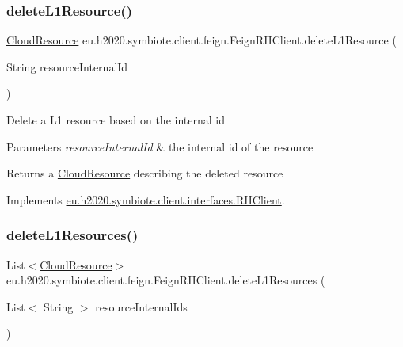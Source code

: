 \subsubsection{\texorpdfstring{delete\+L1\+Resource()}{deleteL1Resource()}}
{\footnotesize\ttfamily \hyperlink{classeu_1_1h2020_1_1symbiote_1_1cloud_1_1model_1_1internal_1_1CloudResource}{Cloud\+Resource} eu.\+h2020.\+symbiote.\+client.\+feign.\+Feign\+R\+H\+Client.\+delete\+L1\+Resource (\begin{DoxyParamCaption}\item[{String}]{resource\+Internal\+Id }\end{DoxyParamCaption})}

Delete a L1 resource based on the internal id


\begin{DoxyParams}{Parameters}
{\em resource\+Internal\+Id} & the internal id of the resource \\
\hline
\end{DoxyParams}
\begin{DoxyReturn}{Returns}
a \hyperlink{}{Cloud\+Resource} describing the deleted resource 
\end{DoxyReturn}


Implements \hyperlink{interfaceeu_1_1h2020_1_1symbiote_1_1client_1_1interfaces_1_1RHClient_a9ed4582f57457a4dd4fe2bf77a6822fc}{eu.\+h2020.\+symbiote.\+client.\+interfaces.\+R\+H\+Client}.

\mbox{\label{classeu_1_1h2020_1_1symbiote_1_1client_1_1feign_1_1FeignRHClient_ae56343520532a4d10423bfa99d49787f}} 
\subsubsection{\texorpdfstring{delete\+L1\+Resources()}{deleteL1Resources()}}
{\footnotesize\ttfamily List$<$\hyperlink{classeu_1_1h2020_1_1symbiote_1_1cloud_1_1model_1_1internal_1_1CloudResource}{Cloud\+Resource}$>$ eu.\+h2020.\+symbiote.\+client.\+feign.\+Feign\+R\+H\+Client.\+delete\+L1\+Resources (\begin{DoxyParamCaption}\item[{List$<$ String $>$}]{resource\+Internal\+Ids }\end{DoxyParamCaption})}

